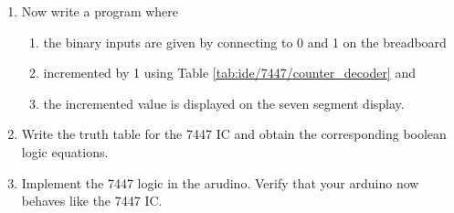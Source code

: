 \begin{enumerate}[label=\arabic*.,ref=\theenumi]
\item
Now write a program where 
\begin{enumerate}
\item the binary inputs are given by
connecting to 0 and 1 on the breadboard
\item incremented by 1 using Table \ref{tab:ide/7447/counter_decoder} and
\item the incremented value is displayed on the seven segment display.
\end{enumerate}

\item
Write the truth table for the 7447 IC and obtain the corresponding boolean logic equations. 

\item
Implement the 7447 logic in the arudino.  Verify that your arduino now behaves like the 7447 IC.
	\end{enumerate}
